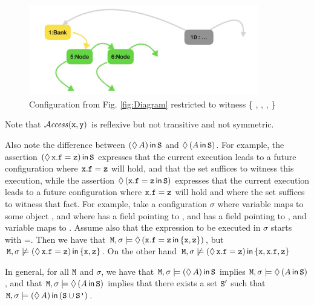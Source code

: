 \begin{figure}[btph]
\includegraphics[width=10cm,height=4cm]{diagram2}
 \caption{Configuration from Fig. \ref{fig:Diagram} restricted to witness \{ , , ,  \}}
  \label{fig:DiagramRestricted}
  \end{figure}

Note that ${\mathcal{A}}\textrm{\textit{ccess}}({\mbox{\tt{x}}},{\mbox{\tt{y}}})$ is reflexive but  not transitive and not symmetric.

Also note the difference between $(\lozenge\, A)\,{\bf{\sf {in}}}\, {\mbox{\tt{S}}}$ and $\lozenge\, (A\,{\bf{\sf {in}}}\, {\mbox{\tt{S}}})$.
For example,  the assertion  $(\lozenge\, {\mbox{\tt{x}}}.{\mbox{\tt{f}}}={\mbox{\tt{z}}})\,{\bf{\sf {in}}}\, {\mbox{\tt{S}}}$ expresses that the current execution
leads to a future configuration  where
${\mbox{\tt{x}}}.{\mbox{\tt{f}}}={\mbox{\tt{z}}}$ will hold, and that the set  suffices to witness this execution, while the assertion
$\lozenge\, ({{\mbox{\tt{x}}}.{\mbox{\tt{f}}}={\mbox{\tt{z}}}} \,{\bf{\sf {in}}}\, {\mbox{\tt{S}}})$  expresses that the current execution
leads to a future configuration   where
${\mbox{\tt{x}}}.{\mbox{\tt{f}}}={\mbox{\tt{z}}}$ will hold and where  the set  suffices to witness
that fact.
For example, take a configuration $\sigma$ where variable  maps to some object , and where  has a field 
pointing to , and  has a field 
pointing to , and variable  maps to  . Assume also that the expression to be executed in $\sigma$ starts with
=. Then we have that
${\mbox{\tt{M}}},\sigma  \models \lozenge\, ({{\mbox{\tt{x}}}.{\mbox{\tt{f}}}={\mbox{\tt{z}}}} \,{\bf{\sf {in}}}\, \{{\mbox{\tt{x}}},{\mbox{\tt{z}}}\})$,
but
${\mbox{\tt{M}}},\sigma  \not\models (\lozenge\, {\mbox{\tt{x}}}.{\mbox{\tt{f}}}={\mbox{\tt{z}}})\,{\bf{\sf {in}}}\, \{{\mbox{\tt{x}}},{\mbox{\tt{z}}}\}$.
On the other hand
${\mbox{\tt{M}}},\sigma  \not\models (\lozenge\, {\mbox{\tt{x}}}.{\mbox{\tt{f}}}={\mbox{\tt{z}}})\,{\bf{\sf {in}}}\, \{{\mbox{\tt{x}}},{\mbox{\tt{x}}}.{\mbox{\tt{f}}},{\mbox{\tt{z}}}\}$

In general, for all ${\mbox{\tt{M}}}$ and $\sigma$, we have that
 ${\mbox{\tt{M}}},\sigma \models  (\lozenge\, A)\,{\bf{\sf {in}}}\, {\mbox{\tt{S}}}$ implies ${\mbox{\tt{M}}},\sigma \models \lozenge\, (A\,{\bf{\sf {in}}}\, {\mbox{\tt{S}}})$, and that
 ${\mbox{\tt{M}}},\sigma \models \lozenge\, (A\,{\bf{\sf {in}}}\, {\mbox{\tt{S}}})$ implies that there exists a set ${\mbox{\tt{S}}}'$ such that
 ${\mbox{\tt{M}}},\sigma \models  (\lozenge\, A)\,{\bf{\sf {in}}}\, ({\mbox{\tt{S}}}\cup{\mbox{\tt{S'}}})$.

